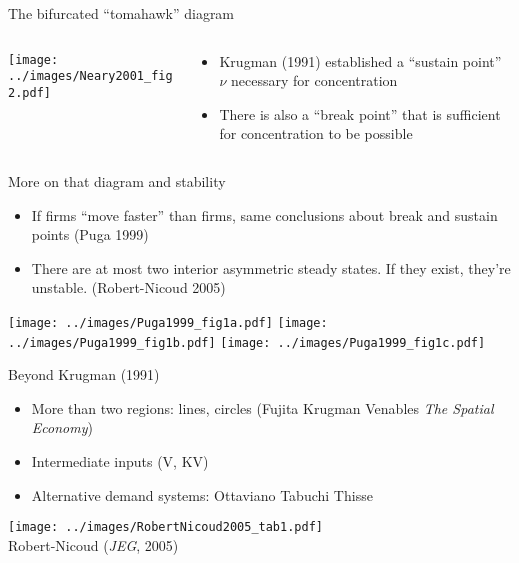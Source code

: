 \documentclass[10pt,notes=hide]{beamer}
\begin{document}
\begin{frame}{The bifurcated ``tomahawk'' diagram}
\begin{columns}
\begin{column}{.5\textwidth}
\texttt{[image: ../images/Neary2001\_fig2.pdf]}
\end{column}
\begin{column}{.48\textwidth}
\begin{itemize}
	\item Krugman (1991) established a ``sustain point'' $\nu$ necessary for concentration
	\item There is also a ``break point'' that is sufficient for concentration to be possible
\end{itemize}
\end{column}
\end{columns}
\end{frame}
\begin{frame}{More on that diagram and stability}
\begin{itemize}
	\item If firms ``move faster'' than firms, same conclusions about break and sustain points (Puga 1999)
	\item There are at most two interior asymmetric steady states. If they exist, they're unstable. (Robert-Nicoud 2005)
\end{itemize}
\texttt{[image: ../images/Puga1999\_fig1a.pdf]}
\texttt{[image: ../images/Puga1999\_fig1b.pdf]}
\texttt{[image: ../images/Puga1999\_fig1c.pdf]}
\end{frame}
\begin{frame}{Beyond Krugman (1991)}
\begin{itemize}
	\item More than two regions: lines, circles (Fujita Krugman Venables \textit{The Spatial Economy})
	\item Intermediate inputs (V, KV)
	\item Alternative demand systems: Ottaviano Tabuchi Thisse
\end{itemize}
\begin{center}
\texttt{[image: ../images/RobertNicoud2005\_tab1.pdf]} \\
\vspace{-2mm}
{\footnotesize Robert-Nicoud (\textit{JEG}, 2005)}
\end{center}
\end{frame}
\end{document}
